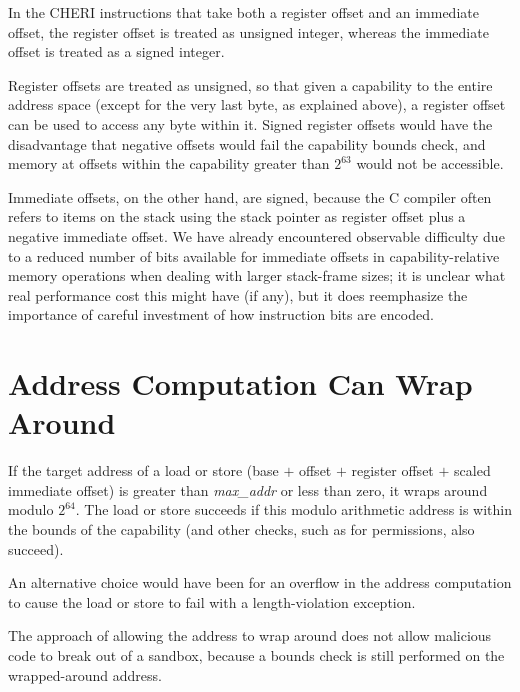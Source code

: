 In the CHERI instructions that take both a register offset and an immediate
offset, the register offset is treated as unsigned integer, whereas the
immediate offset is treated as a signed integer.

Register offsets are treated as unsigned, so that given a capability to
the entire address space (except for the very last byte, as
explained above), a register offset can be used to access any byte within it.
Signed register offsets would have the disadvantage that negative offsets
would fail the capability bounds check, and memory at offsets within the
capability greater than $2^{63}$ would not be accessible.

Immediate offsets, on the other hand, are signed, because the C compiler
often refers to items on the stack using the stack pointer as register
offset plus a negative immediate offset.
We have already encountered observable difficulty due to a reduced number of
bits available for immediate offsets in capability-relative memory operations
when dealing with larger stack-frame sizes; it is unclear what real
performance cost this might have (if any), but it does reemphasize the
importance of careful investment of how instruction bits are encoded.

\section{Address Computation Can Wrap Around}

If the target address of a load or store (base $+$ offset $+$ register offset
$+$ scaled immediate offset) is greater than \emph{max\_addr} or less than
zero, it wraps around modulo $2^{64}$. The load or store succeeds if this
modulo arithmetic address is within the bounds of the capability (and other
checks, such as for permissions, also succeed).

An alternative choice would have been for an overflow in the address computation
to cause the load or store to fail with a length-violation exception.

The approach of allowing the address to wrap around does not allow malicious
code to break out of a sandbox, because a bounds check is still performed on
the wrapped-around address.

